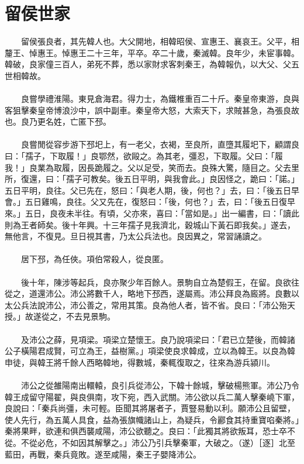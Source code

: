 \section{留侯世家}
　　留侯張良者，其先韓人也。大父開地，相韓昭侯、宣惠王、襄哀王。父平，相釐王、悼惠王。悼惠王二十三年，平卒。卒二十歲，秦滅韓。良年少，未宦事韓。韓破，良家僮三百人，弟死不葬，悉以家財求客刺秦王，為韓報仇，以大父、父五世相韓故。
\\\\
　　良嘗學禮淮陽。東見倉海君。得力士，為鐵椎重百二十斤。秦皇帝東游，良與客狙擊秦皇帝博浪沙中，誤中副車。秦皇帝大怒，大索天下，求賊甚急，為張良故也。良乃更名姓，亡匿下邳。
\\\\
　　良嘗閒從容步游下邳圯上，有一老父，衣褐，至良所，直墮其履圯下，顧謂良曰：「孺子，下取履！」良鄂然，欲毆之。為其老，彊忍，下取履。父曰：「履我！」良業為取履，因長跪履之。父以足受，笑而去。良殊大驚，隨目之。父去里所，復還，曰：「孺子可教矣。後五日平明，與我會此。」良因怪之，跪曰：「諾。」五日平明，良往。父已先在，怒曰：「與老人期，後，何也？」去，曰：「後五日早會。」五日雞鳴，良往。父又先在，復怒曰：「後，何也？」去，曰：「後五日復早來。」五日，良夜未半往。有頃，父亦來，喜曰：「當如是。」出一編書，曰：「讀此則為王者師矣。後十年興。十三年孺子見我濟北，穀城山下黃石即我矣。」遂去，無他言，不復見。旦日視其書，乃太公兵法也。良因異之，常習誦讀之。
\\\\
　　居下邳，為任俠。項伯常殺人，從良匿。
\\\\
　　後十年，陳涉等起兵，良亦聚少年百餘人。景駒自立為楚假王，在留。良欲往從之，道還沛公。沛公將數千人，略地下邳西，遂屬焉。沛公拜良為廄將。良數以太公兵法說沛公，沛公善之，常用其策。良為他人者，皆不省。良曰：「沛公殆天授。」故遂從之，不去見景駒。
\\\\
　　及沛公之薛，見項梁。項梁立楚懷王。良乃說項梁曰：「君已立楚後，而韓諸公子橫陽君成賢，可立為王，益樹黨。」項梁使良求韓成，立以為韓王。以良為韓申徒，與韓王將千餘人西略韓地，得數城，秦輒復取之，往來為游兵潁川。
\\\\
　　沛公之從雒陽南出轘轅，良引兵從沛公，下韓十餘城，擊破楊熊軍。沛公乃令韓王成留守陽翟，與良俱南，攻下宛，西入武關。沛公欲以兵二萬人擊秦嶢下軍，良說曰：「秦兵尚彊，未可輕。臣聞其將屠者子，賈豎易動以利。願沛公且留壁，使人先行，為五萬人具食，益為張旗幟諸山上，為疑兵，令酈食其持重寶啗秦將。」秦將果畔，欲連和俱西襲咸陽，沛公欲聽之。良曰：「此獨其將欲叛耳，恐士卒不從。不從必危，不如因其解擊之。」沛公乃引兵擊秦軍，大破之。（遂）［逐］北至藍田，再戰，秦兵竟敗。遂至咸陽，秦王子嬰降沛公。
